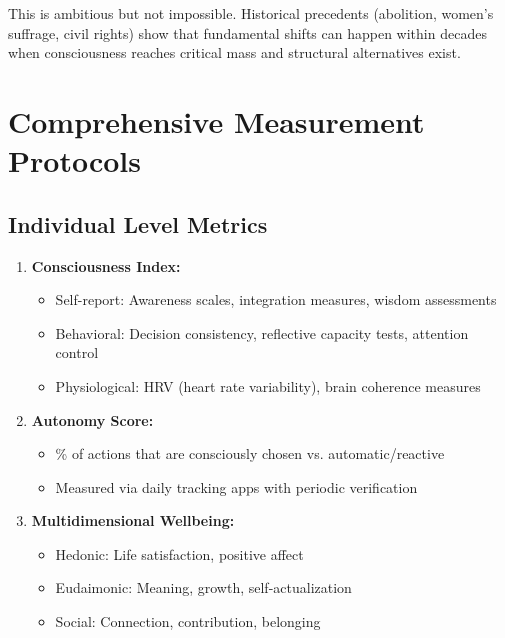 \documentclass[11pt,a4paper]{article}
\theoremstyle{definition}
\theoremstyle{remark}
\begin{document}
This is ambitious but not impossible. Historical precedents (abolition, women's suffrage, civil rights) show that fundamental shifts can happen within decades when consciousness reaches critical mass and structural alternatives exist.

\section{Comprehensive Measurement Protocols}
\label{app:measurement}

\subsection{Individual Level Metrics}

\begin{enumerate}[leftmargin=1.5em]
    \item \textbf{Consciousness Index:}
    \begin{itemize}
        \item Self-report: Awareness scales, integration measures, wisdom assessments
        \item Behavioral: Decision consistency, reflective capacity tests, attention control
        \item Physiological: HRV (heart rate variability), brain coherence measures
    \end{itemize}
    
    \item \textbf{Autonomy Score:}
    \begin{itemize}
        \item \% of actions that are consciously chosen vs. automatic/reactive
        \item Measured via daily tracking apps with periodic verification
    \end{itemize}
    
    \item \textbf{Multidimensional Wellbeing:}
    \begin{itemize}
        \item Hedonic: Life satisfaction, positive affect
        \item Eudaimonic: Meaning, growth, self-actualization
        \item Social: Connection, contribution, belonging
    \end{itemize}
\end{enumerate}
\end{document}
